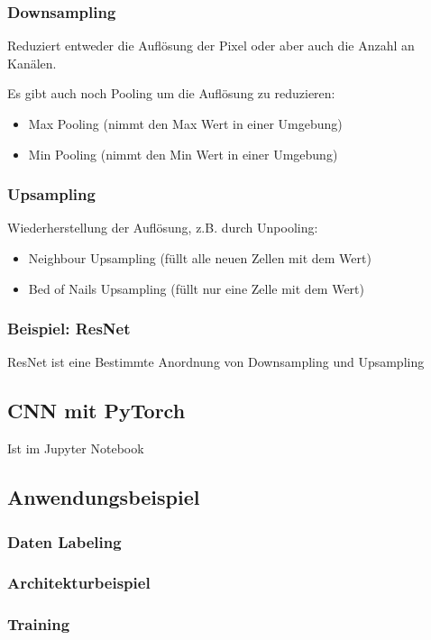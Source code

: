 \documentclass[a4paper]{article}
\begin{document}
\subsubsection{Downsampling}

Reduziert entweder die Auflösung der Pixel oder aber auch die Anzahl an Kanälen.

Es gibt auch noch Pooling um die Auflösung zu reduzieren:

\begin{itemize}
    \item Max Pooling (nimmt den Max Wert in einer Umgebung)
    \item Min Pooling (nimmt den Min Wert in einer Umgebung)
\end{itemize}

\subsubsection{Upsampling}

Wiederherstellung der Auflösung, z.B. durch Unpooling:

\begin{itemize}
    \item Neighbour Upsampling (füllt alle neuen Zellen mit dem Wert)
    \item Bed of Nails Upsampling (füllt nur eine Zelle mit dem Wert)
\end{itemize}

\subsubsection{Beispiel: ResNet}

ResNet ist eine Bestimmte Anordnung von Downsampling und Upsampling

\subsection{CNN mit PyTorch}

Ist im Jupyter Notebook

\subsection{Anwendungsbeispiel}

\subsubsection{Daten Labeling}

\subsubsection{Architekturbeispiel}

\subsubsection{Training}
\end{document}
